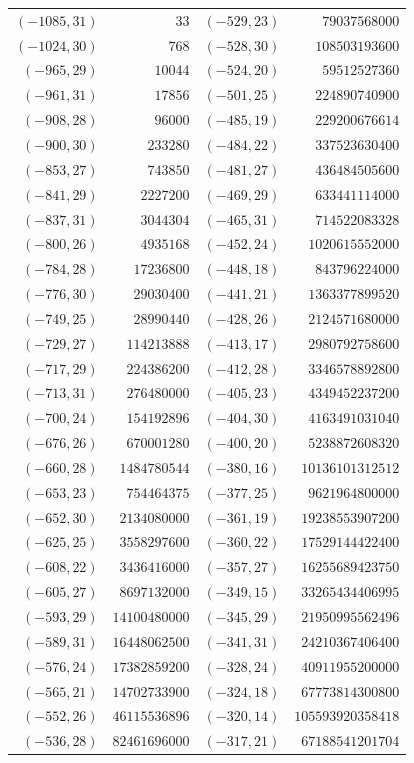 \documentclass[11pt]{amsart}
\theoremstyle{definition}
\begin{document}
{\scriptsize\begin{tabular}{@{}r@{\ \ }r@{\qquad}r@{\ \ }r@{}}
$(-1085,31)$ & $33$ & $(-529,23)$ & $79037568000$ \\
$(-1024,30)$ & $768$ & $(-528,30)$ & $108503193600$ \\
$(-965,29)$ & $10044$ & $(-524,20)$ & $59512527360$ \\
$(-961,31)$ & $17856$ & $(-501,25)$ & $224890740900$ \\
$(-908,28)$ & $96000$ & $(-485,19)$ & $229200676614$ \\
$(-900,30)$ & $233280$ & $(-484,22)$ & $337523630400$ \\
$(-853,27)$ & $743850$ & $(-481,27)$ & $436484505600$ \\
$(-841,29)$ & $2227200$ & $(-469,29)$ & $633441114000$ \\
$(-837,31)$ & $3044304$ & $(-465,31)$ & $714522083328$ \\
$(-800,26)$ & $4935168$ & $(-452,24)$ & $1020615552000$ \\
$(-784,28)$ & $17236800$ & $(-448,18)$ & $843796224000$ \\
$(-776,30)$ & $29030400$ & $(-441,21)$ & $1363377899520$ \\
$(-749,25)$ & $28990440$ & $(-428,26)$ & $2124571680000$ \\
$(-729,27)$ & $114213888$ & $(-413,17)$ & $2980792758600$ \\
$(-717,29)$ & $224386200$ & $(-412,28)$ & $3346578892800$ \\
$(-713,31)$ & $276480000$ & $(-405,23)$ & $4349452237200$ \\
$(-700,24)$ & $154192896$ & $(-404,30)$ & $4163491031040$ \\
$(-676,26)$ & $670001280$ & $(-400,20)$ & $5238872608320$ \\
$(-660,28)$ & $1484780544$ & $(-380,16)$ & $10136101312512$ \\
$(-653,23)$ & $754464375$ & $(-377,25)$ & $9621964800000$ \\
$(-652,30)$ & $2134080000$ & $(-361,19)$ & $19238553907200$ \\
$(-625,25)$ & $3558297600$ & $(-360,22)$ & $17529144422400$ \\
$(-608,22)$ & $3436416000$ & $(-357,27)$ & $16255689423750$ \\
$(-605,27)$ & $8697132000$ & $(-349,15)$ & $33265434406995$ \\
$(-593,29)$ & $14100480000$ & $(-345,29)$ & $21950995562496$ \\
$(-589,31)$ & $16448062500$ & $(-341,31)$ & $24210367406400$ \\
$(-576,24)$ & $17382859200$ & $(-328,24)$ & $40911955200000$ \\
$(-565,21)$ & $14702733900$ & $(-324,18)$ & $67773814300800$ \\
$(-552,26)$ & $46115536896$ & $(-320,14)$ & $105593920358418$ \\
$(-536,28)$ & $82461696000$ & $(-317,21)$ & $67188541201704$ \\
\end{tabular}}\par
\end{document}
